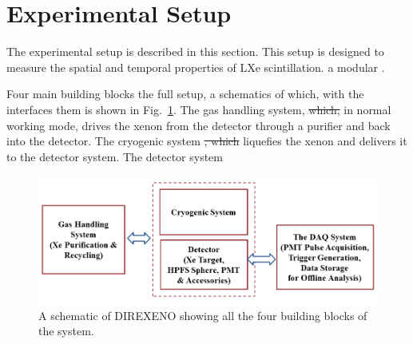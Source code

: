 \section{Experimental Setup}
\label{expSetup}


The experimental setup  is described in this section. This setup is 
designed to measure the spatial and temporal properties of LXe scintillation. 
 a modular . 

Four main building blocks  the full setup, a schematics 
of which, with the interfaces  them is shown in Fig.~\ref{fig:fullschematics}. 
The gas handling system, \sout{which,} in normal working mode, drives the xenon from the detector 
through a purifier and  back into the detector. The cryogenic system \sout{, which} 
liquefies the xenon and delivers it to the detector system. The detector system 

\begin{figure}[h]
\centerline{\includegraphics[width=0.8\linewidth]{WholeSys.png}}
\caption{A schematic of DIREXENO showing all the four building blocks of the system.}
\label{fig:fullschematics}
\end{figure}

